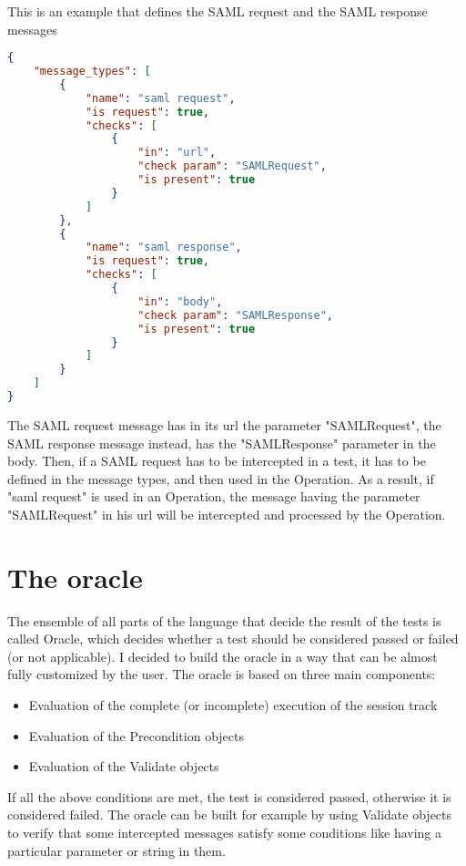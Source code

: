 This is an example that defines the \Gls{SAML} request and the \Gls{SAML} response messages
\begin{lstlisting}[language=json, caption=Message Types definition]
{
    "message_types": [
        {
            "name": "saml request",
            "is request": true,
            "checks": [
                {
                    "in": "url",
                    "check param": "SAMLRequest",
                    "is present": true
                }
            ]
        },
        {
            "name": "saml response",
            "is request": true,
            "checks": [
                {
                    "in": "body",
                    "check param": "SAMLResponse",
                    "is present": true
                }
            ]
        }
    ]
}
\end{lstlisting}
The \Gls{SAML} request message has in its url the parameter "SAMLRequest", the \Gls{SAML} response message instead, has the "SAMLResponse" parameter in the body. Then, if a \Gls{SAML} request has to be intercepted in a test, it has to be defined in the message types, and then used in the Operation.
As a result, if "saml request" is used in an Operation, the message having the parameter "SAMLRequest" in his url will be intercepted and processed by the Operation.


\section{The oracle}
The ensemble of all parts of the language that decide the result of the tests is called Oracle,
which decides whether a test should be considered passed or failed (or not applicable). I decided to build the oracle in a way that can be almost fully customized by the user. 
The oracle is based on three main components:
\begin{itemize}
    \item Evaluation of the complete (or incomplete) execution of the \gls{session track} 
    \item Evaluation of the Precondition objects
    \item Evaluation of the Validate objects
\end{itemize}
If all the above conditions are met, the test is considered passed, otherwise it is considered failed.
The oracle can be built for example by using Validate objects to verify that some intercepted messages satisfy some conditions like having a particular parameter or string in them.

